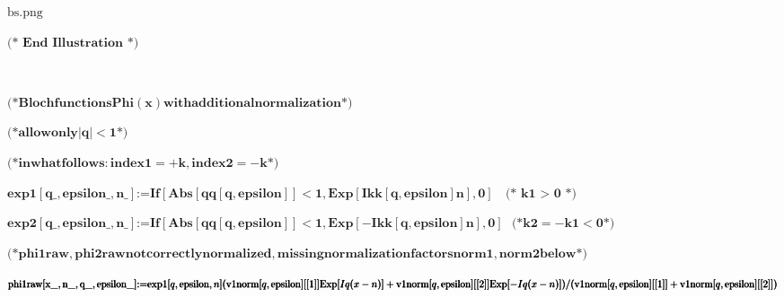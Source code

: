 {\begin{doublespace}
\noindent\(\text{bs.png}\)
\end{doublespace}

\begin{doublespace}
\noindent\(\pmb{\text{(* End Illustration *)}}\)
\end{doublespace}

\begin{doublespace}
\noindent\(\pmb{\text{}}\)
\end{doublespace}

\begin{doublespace}
\noindent\(\pmb{\text{(*} \text{Bloch} \text{functions} \text{Phi}(x) \text{with} \text{additional} \text{normalization} \text{*)} }\)
\end{doublespace}

\begin{doublespace}
\noindent\(\pmb{\text{(*} \text{allow} \text{only} |q|<1 \text{*)}}\)
\end{doublespace}

\begin{doublespace}
\noindent\(\pmb{\text{(*} \text{in} \text{what} \text{follows}: \text{index} 1 = +k, \text{index} 2 = -k \text{*)}}\)
\end{doublespace}

\begin{doublespace}
\noindent\(\pmb{\text{exp1}[\text{q$\_$},\text{epsilon$\_$},\text{n$\_$}]\text{:=}\text{If}[\text{Abs}[\text{qq}[q,\text{epsilon}]]<1,\text{Exp}[I
\text{kk}[q,\text{epsilon}] n],0]\text{      }\text{(* k1 $>$ 0 *)}}\)
\end{doublespace}

\begin{doublespace}
\noindent\(\pmb{\text{exp2}[\text{q$\_$},\text{epsilon$\_$},\text{n$\_$}]\text{:=}\text{If}[\text{Abs}[\text{qq}[q,\text{epsilon}]]<1,\text{Exp}[-I
\text{kk}[q,\text{epsilon}] n],0]\text{   }\text{(*} \text{k2} = -\text{k1} < 0 \text{*)}}\)
\end{doublespace}

\begin{doublespace}
\noindent\(\pmb{\text{(*} \text{phi1raw}, \text{phi2raw} \text{not} \text{correctly} \text{normalized}, \text{missing} \text{normalization} \text{factors}
\text{norm1}, \text{norm2} \text{below} \text{*)}}\)
\end{doublespace}

\begin{doublespace}
\noindent\(\pmb{\text{phi1raw}[\text{x$\_$},\text{n$\_$},\text{q$\_$},\text{epsilon$\_$}]\text{:=}}\\
\pmb{\text{exp1}[q,\text{epsilon},n] (\text{v1norm}[q,\text{epsilon}][[1]]\text{Exp}[I q (x-n)]+\text{v1norm}[q,\text{epsilon}][[2]]\text{Exp}[-I
q (x-n)])/}\\
\pmb{(\text{v1norm}[q,\text{epsilon}][[1]]+\text{v1norm}[q,\text{epsilon}][[2]])}\)
\end{doublespace}

}
